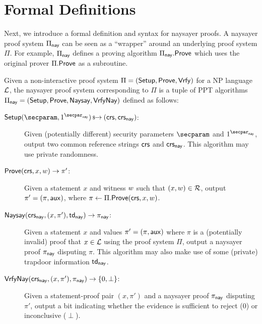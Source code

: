 \section{Formal Definitions}\label{sec:naysayer_def}

Next, we introduce a formal definition and syntax for naysayer proofs. A naysayer proof system $\Pi_{\mathsf{nay}}$ can be seen as a ``wrapper'' around an underlying proof system $\Pi$. For example, $\Pi_{\sf nay}$ defines a proving algorithm $\Pi_{\mathsf{nay}}.\mathsf{Prove}$ which uses the original prover $\Pi.\mathsf{Prove}$ as a subroutine.

\begin{definition}\label{def:naysayer_proof}
Given a non-interactive proof system $\Pi = (\mathsf{Setup}, \mathsf{Prove}, \mathsf{Vrfy})$ for a NP language $\mathcal{L}$, the naysayer proof system corresponding to $\Pi$ is a tuple of PPT algorithms $\Pi_{\mathsf{nay}} = (\mathsf{Setup}, \mathsf{Prove},\allowbreak \mathsf{Naysay}, {\mathsf{Vrfy}}\mathsf{Nay})$ defined as follows:
    \begin{description}
        \item[$\setup(\secparam, \naysecparam) \randout (\crs,\crs_{\nay})$:] Given (potentially different) security parameters $\secparam$ and $\naysecparam$, output two common reference strings $\mathsf{crs}$ and $\mathsf{crs}_{\mathsf{nay}}$. This algorithm may use private randomness.
        \item[$\mathsf{Prove}(\mathsf{crs}, x, w) \to \pi'$:] Given a statement $x$ and witness $w$ such that $(x,\allowbreak w) \in \mathcal{R}$, 
        output $\pi' = (\pi, \mathsf{aux})$, where $\pi \gets \Pi.\mathsf{Prove}(\mathsf{crs}, x, w)$.
        \item[$\mathsf{Naysay}(\mathsf{crs}_{\mathsf{nay}}, (x,\pi'), \mathsf{td}_{\mathsf{nay}}) \rightarrow \pi_{\mathsf{nay}}$:] Given a statement $x$ and values $\pi' = (\pi,\allowbreak \mathsf{aux})$ where $\pi$ is a (potentially invalid) proof that $x \in \mathcal{L}$ using the proof system $\Pi$, output a naysayer proof $\pi_{\mathsf{nay}}$ disputing $\pi$. This algorithm may also make use of some (private) trapdoor information $\mathsf{td}_{\mathsf{nay}}$.
        \item[${\mathsf{Vrfy}}\mathsf{Nay}(\mathsf{crs}_{\mathsf{nay}}, (x,\pi'), \pi_{\mathsf{nay}}) \rightarrow \{0, \perp\}$:] Given a statement-proof pair $(x,\allowbreak \pi')$ and a naysayer proof $\pi_{\mathsf{nay}}$ disputing $\pi'$, output a bit indicating whether the evidence is sufficient to reject (0) or inconclusive ($\perp$).
    \end{description}
\end{definition}

